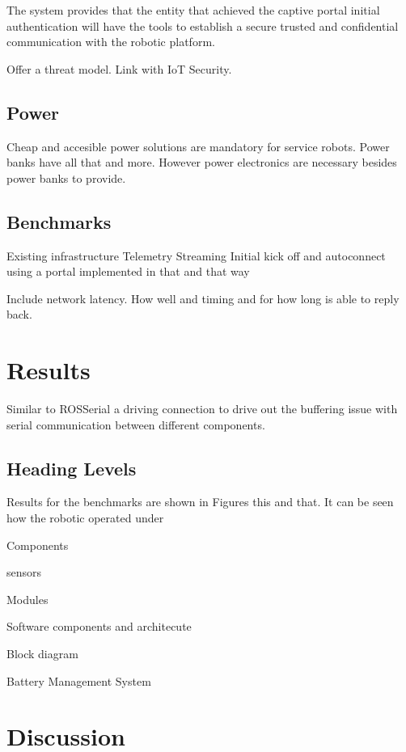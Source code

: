 The system provides that the entity that achieved the captive portal initial authentication will have the tools to establish a secure trusted and confidential communication with the robotic platform.

Offer a threat model.  Link with IoT Security.

\subsection{Power}

Cheap and accesible power solutions are mandatory for service robots.  Power banks have all that and more.
However power electronics are necessary besides power banks to provide.

\subsection{Benchmarks}

Existing infrastructure
Telemetry
Streaming
Initial kick off and autoconnect using a portal implemented in that and that way

Include network latency.  How well and timing and for how long is able to reply back.

\section{Results}
\label{sec:results}

Similar to ROSSerial a driving connection to drive out the buffering issue with serial communication between different components.

\subsection{Heading Levels}

Results for the benchmarks are shown in Figures this and that.  It can be seen how the robotic operated under 


Components 

sensors

Modules

Software components and architecute

Block diagram

Battery Management System 
\section{Discussion}


